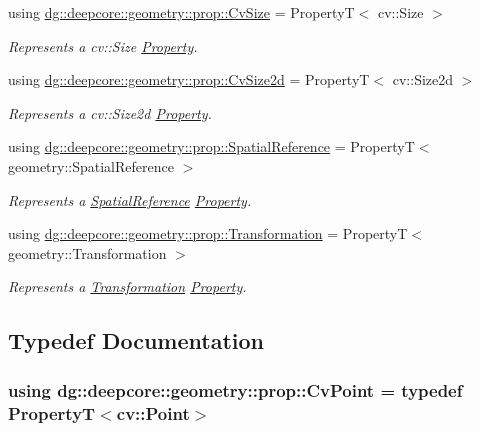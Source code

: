 \begin{DoxyCompactItemize}
using \hyperlink{group___geometry_properties_ga6c3ae9a94a21cad03ae025518ed4376c}{dg\+::deepcore\+::geometry\+::prop\+::\+Cv\+Size} = PropertyT$<$ cv\+::\+Size $>$
\begin{DoxyCompactList}\small\item\em Represents a {\ttfamily cv\+::\+Size} \hyperlink{classdg_1_1deepcore_1_1_property}{Property}. \end{DoxyCompactList}\item 
using \hyperlink{group___geometry_properties_gab05ab73bf2f4d38593c25af9928dd476}{dg\+::deepcore\+::geometry\+::prop\+::\+Cv\+Size2d} = PropertyT$<$ cv\+::\+Size2d $>$
\begin{DoxyCompactList}\small\item\em Represents a {\ttfamily cv\+::\+Size2d} \hyperlink{classdg_1_1deepcore_1_1_property}{Property}. \end{DoxyCompactList}\item 
using \hyperlink{group___geometry_properties_gae23c0f56a7a0e1cf724aaddb7aa3727f}{dg\+::deepcore\+::geometry\+::prop\+::\+Spatial\+Reference} = PropertyT$<$ geometry\+::\+Spatial\+Reference $>$
\begin{DoxyCompactList}\small\item\em Represents a \hyperlink{classdg_1_1deepcore_1_1geometry_1_1_spatial_reference}{Spatial\+Reference} \hyperlink{classdg_1_1deepcore_1_1_property}{Property}. \end{DoxyCompactList}\item 
using \hyperlink{group___geometry_properties_gaee5fb371295b38850e2e6eabd04be3b3}{dg\+::deepcore\+::geometry\+::prop\+::\+Transformation} = PropertyT$<$ geometry\+::\+Transformation $>$
\begin{DoxyCompactList}\small\item\em Represents a \hyperlink{structdg_1_1deepcore_1_1geometry_1_1_transformation}{Transformation} \hyperlink{classdg_1_1deepcore_1_1_property}{Property}. \end{DoxyCompactList}\end{DoxyCompactItemize}


\subsection{Typedef Documentation}
\subsubsection[{\texorpdfstring{Cv\+Point}{CvPoint}}]{\setlength{\rightskip}{0pt plus 5cm}using {\bf dg\+::deepcore\+::geometry\+::prop\+::\+Cv\+Point} = typedef PropertyT$<$cv\+::\+Point$>$}\hypertarget{group___geometry_properties_gab53d82d9179777c4980eac502530a8c6}{}\label{group___geometry_properties_gab53d82d9179777c4980eac502530a8c6}



